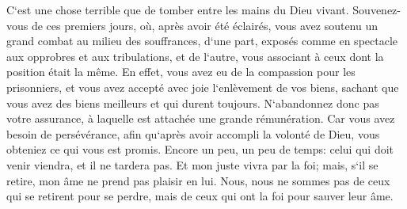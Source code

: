 \verse C`est une chose terrible que de tomber entre les mains du Dieu vivant. 
\verse Souvenez-vous de ces premiers jours, où, après avoir été éclairés, vous avez soutenu un grand combat au milieu des souffrances, 
\verse d`une part, exposés comme en spectacle aux opprobres et aux tribulations, et de l`autre, vous associant à ceux dont la position était la même. 
\verse En effet, vous avez eu de la compassion pour les prisonniers, et vous avez accepté avec joie l`enlèvement de vos biens, sachant que vous avez des biens meilleurs et qui durent toujours. 
\verse N`abandonnez donc pas votre assurance, à laquelle est attachée une grande rémunération. 
\verse Car vous avez besoin de persévérance, afin qu`après avoir accompli la volonté de Dieu, vous obteniez ce qui vous est promis. 
\verse Encore un peu, un peu de temps: celui qui doit venir viendra, et il ne tardera pas. 
\verse Et mon juste vivra par la foi; mais, s`il se retire, mon âme ne prend pas plaisir en lui. 
\verse Nous, nous ne sommes pas de ceux qui se retirent pour se perdre, mais de ceux qui ont la foi pour sauver leur âme. 

